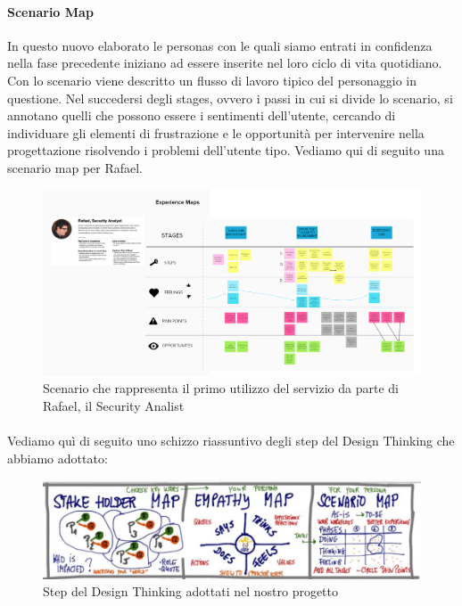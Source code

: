 \paragraph{Scenario Map}
In questo nuovo elaborato le personas con le quali siamo entrati in confidenza nella fase precedente iniziano ad essere inserite nel loro ciclo di vita quotidiano. Con lo scenario viene descritto un flusso di lavoro tipico del personaggio in questione. Nel succedersi degli stages, ovvero i passi in cui si divide lo scenario, si annotano quelli che possono essere i sentimenti dell'utente, cercando di individuare gli elementi di frustrazione e le opportunità per intervenire nella progettazione risolvendo i problemi dell'utente tipo. Vediamo qui di seguito una scenario map per Rafael.
\begin{figure} [h!]
	\centering
	\includegraphics[width=0.7\linewidth]{capitoli/imgs/scenarioRafael.PNG}
	\caption{Scenario che rappresenta il primo utilizzo del servizio da parte di Rafael, il Security Analist }
	\label{fig:scen1}
\end{figure}

\paragraph{}
Vediamo quì di seguito uno schizzo riassuntivo degli step del Design Thinking che abbiamo adottato:
\begin{figure} [h!]
	\centering
	\includegraphics[width=0.7\linewidth]{capitoli/imgs/schizzodesthink.PNG}
	\caption{Step del Design Thinking adottati nel nostro progetto}
	\label{fig:dt}
\end{figure}

